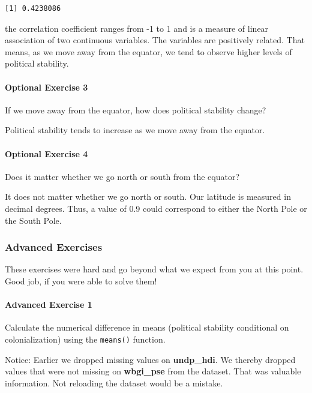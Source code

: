\documentclass[]{article}
\let\oldparagraph\paragraph
\renewcommand{\paragraph}[1]{\oldparagraph{#1}\mbox{}}
\theoremstyle{definition}
\theoremstyle{definition}
\theoremstyle{definition}
\theoremstyle{remark}
\begin{document}
\begin{verbatim}
[1] 0.4238086
\end{verbatim}

the correlation coefficient ranges from -1 to 1 and is a measure of
linear association of two continuous variables. The variables are
positively related. That means, as we move away from the equator, we
tend to observe higher levels of political stability.

\paragraph{Optional Exercise 3}\label{optional-exercise-3}

If we move away from the equator, how does political stability change?

Political stability tends to increase as we move away from the equator.

\paragraph{Optional Exercise 4}\label{optional-exercise-4}

Does it matter whether we go north or south from the equator?

It does not matter whether we go north or south. Our latitude is
measured in decimal degrees. Thus, a value of 0.9 could correspond to
either the North Pole or the South Pole.

\subsubsection{Advanced Exercises}\label{advanced-exercises-1}

These exercises were hard and go beyond what we expect from you at this
point. Good job, if you were able to solve them!

\paragraph{Advanced Exercise 1}\label{advanced-exercise-1}

Calculate the numerical difference in means (political stability
conditional on colonialization) using the \texttt{means()} function.

Notice: Earlier we dropped missing values on \textbf{undp\_hdi}. We
thereby dropped values that were not missing on \textbf{wbgi\_pse} from
the dataset. That was valuable information. Not reloading the dataset
would be a mistake.
\end{document}
